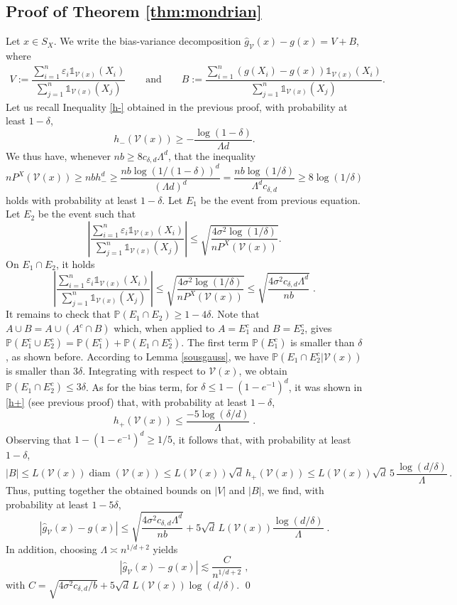 \documentclass[paper=a4, fontsize=11pt]{scrartcl}
\newcommand{\diam}{\operatorname{diam}}
\newcommand{\ind}{\mathds{1}}
\begin{document}
\subsection*{Proof of Theorem \ref{thm:mondrian}}
Let \(x \in S_X\). We write the bias-variance decomposition $\hat g_{\mathcal V}(x) - g(x) = V + B$, where \begin{align*}
    V := \dfrac{\sum_{i=1}^n \varepsilon_i \ind_{ \mathcal V(x) }(X_i)}{\sum_{j=1}^n \ind_{ \mathcal V(x) }(X_j)} \qquad \text{and}\qquad
       B := \dfrac{\sum_{i=1}^n \left(g(X_i) - g(x)\right) \ind_{ \mathcal V(x) }(X_i)}{\sum_{j=1}^n \ind_{ \mathcal V(x) }(X_j)}.
\end{align*}
Let us recall Inequality \eqref{h-} obtained in the previous proof, with probability at least \(1 - \delta\),  $$h_-(\mathcal V (x)) \geq - \frac{\log(1-\delta)}{\Lambda d}.$$ We thus have, whenever $n b\geq 8  c_{\delta,d} \Lambda^d$, that the inequality 
$$n P^X(\mathcal{V}(x)) \geq n b h_-^d \geq \frac{nb \log(1/(1-\delta))^d} { (\Lambda d)^d} = \frac{nb \log(1/\delta) }{\Lambda^d c_{\delta,d} } \geq 8 \log(1/\delta)$$
holds with probability at least $1-\delta$. Let $E_1$ be the event from previous equation. Let $E_2 $ be the event such that
$$\left| \dfrac{\sum_{i=1}^n \varepsilon_i \ind _{ \mathcal V(x) }(X_i)}{{\sum_{j=1}^n \ind _{ \mathcal V(x) }(X_j)}}  \right| \leq \sqrt{\dfrac{4 \sigma^2 \log(1/\delta)}{n P^X(\mathcal{V}(x))} } .$$
On $E_1\cap E_2 $, it holds
\[
\left| \dfrac{\sum_{i=1}^n \varepsilon_i \ind _{ \mathcal V(x) }(X_i)}{{\sum_{j=1}^n \ind _{ \mathcal V(x) }(X_j)}}  \right| \leq \sqrt{\dfrac{4\sigma^2 \log(1/\delta)}{n P^X(\mathcal{V}(x))}} \leq \sqrt{\dfrac{4\sigma^2 c_{\delta,d} \Lambda^d  }{n b}}\;.
\]
It remains to check that $\mathbb P ( E_1\cap E_2) \geq 1-4\delta$. Note that 
$A\cup B = A \cup  (A^c\cap B)  $
which, when applied to $ A = E_1^c$ and $B = E_2^c $, gives $\mathbb P ( E_1^c\cup E_2^c) = \mathbb P (  E_1^c) + \mathbb P ( E_1\cap E_2^c)   $. The first term $ \mathbb P (  E_1^c)$ is smaller than $\delta$, as shown before.
 According to Lemma \ref{sousgauss}, we have $\mathbb P ( E_1\cap E_2^c |\mathcal{V}(x)) $ is smaller than $3\delta$. Integrating with respect to $\mathcal{V}(x)$, we obtain $\mathbb P ( E_1\cap E_2^c )\leq 3\delta $. 
As for the bias term, for $\delta \leq 1 - (1 - e^{-1})^d$, it was shown in \eqref{h+} (see previous proof) that, with probability at least $1-\delta$,  \[ h_+(\mathcal V (x)) \leq \dfrac{-5\log(\delta/d)}{\Lambda}\;.\]
Observing that $ 1 - (1 - e^{-1})^d \geq 1/5$, it follows that, with probability at least $1-\delta$, 
$$ |B|\leq L (\mathcal V(x)) \diam(\mathcal{ V } (x)) \leq L (\mathcal V(x))  \sqrt{d} \, h_+(\mathcal{ V } (x)) \leq L (\mathcal V(x))   \sqrt{d}\, 5 \, \frac{\log(d/\delta)}{\Lambda}\,.$$ 
Thus, putting together the obtained bounds on $|V|$ and $|B|$, we find, with probability at least $1-5\delta$,
  \[
 | \hat g_{\mathcal V}(x) - g(x)| \leq \sqrt{\dfrac{4\sigma^2 c_{\delta,d} \Lambda^d }{n b }} +  5 \sqrt{d} \, L(\mathcal{ V } (x)) \frac{\log(d/\delta)}{\Lambda}\;.
\]
In addition, choosing $\Lambda \asymp n^{1/d+2}$ yields
  \[
 | \hat g_{\mathcal V}(x) - g(x)| \lesssim \dfrac{C}{n^{1/d+2}}\;,
\]
with $C = \sqrt{{4\sigma^2 c_{\delta, d}   }/ {b }} +  5 \sqrt{d} \, L(\mathcal{ V } (x))\log(d/\delta).$ \qed
\end{document}
